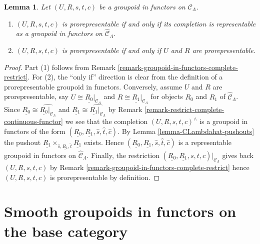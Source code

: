 \documentclass{stacks-project}
\theoremstyle{plain}
\newtheorem{lemma}[subsection]{Lemma}
\theoremstyle{definition}
\theoremstyle{remark}
\numberwithin{equation}{subsection}
\begin{document}
\begin{lemma}
\label{lemma-groupoid-in-functors-prorep-equivalences}
Let $(U, R, s, t, c)$ be a groupoid in functors on $\mathcal{C}_\Lambda$.
\begin{enumerate}
\item $(U, R, s, t, c)$ is prorepresentable if and only if its completion is
representable as a groupoid in functors on $\widehat{\mathcal{C}}_\Lambda$.
\item $(U, R, s, t, c)$ is prorepresentable if and only if $U$ and $R$ are
prorepresentable.
\end{enumerate}
\end{lemma}

\begin{proof}
Part (1) follows from
Remark \ref{remark-groupoid-in-functors-complete-restrict}.
For (2), the ``only if'' direction is clear from the definition
of a prorepresentable groupoid in functors. Conversely, assume $U$ and $R$
are prorepresentable, say $U \cong \underline{R_0}|_{\mathcal{C}_\Lambda}$
and $R \cong \underline{R_1}|_{\mathcal{C}_\Lambda}$ for objects $R_0$ and
$R_1$ of $\widehat{\mathcal{C}}_\Lambda$.
Since $\underline{R_0} \cong \widehat{\underline{R_0}|_{\mathcal{C}_\Lambda}}$
and $\underline{R_1} \cong \widehat{\underline{R_1}|_{\mathcal{C}_\Lambda}}$
by
Remark \ref{remark-restrict-complete-continuous-functor}
we see that the completion $(U, R, s, t, c)^\wedge$ is a groupoid in
functors of the form
$(\underline{R_0}, \underline{R_1}, \widehat{s}, \widehat{t}, \widehat{c})$.
By
Lemma \ref{lemma-CLambdahat-pushouts}
the pushout
$\underline{R_1} \times_{\widehat{s}, \underline{R_1}, \widehat{t}}
\underline{R_1}$ exists. Hence
$(\underline{R_0}, \underline{R_1}, \widehat{s}, \widehat{t}, \widehat{c})$
is a representable groupoid in functors on $\widehat{\mathcal{C}}_\Lambda$.
Finally, the restriction
$(\underline{R_0}, \underline{R_1}, s, t, c)|_{\mathcal{C}_\Lambda}$
gives back $(U, R, s, t, c)$ by
Remark \ref{remark-groupoid-in-functors-complete-restrict}
hence $(U, R, s, t, c)$ is prorepresentable by definition.
\end{proof}






\section{Smooth groupoids in functors on the base category}
\label{section-smooth-minimal-groupoids-in-functors}
\end{document}
